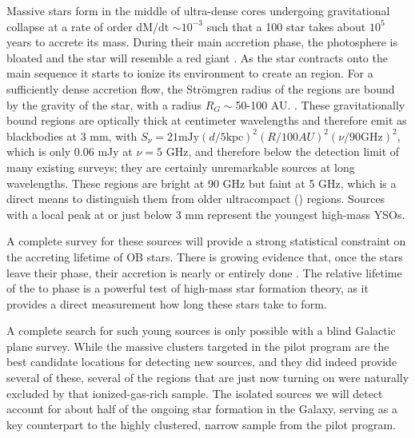 \documentclass[11pt,preprint]{aastex_nofoot}
\begin{document}
Massive stars form in the middle of ultra-dense cores undergoing gravitational
collapse at a rate of order dM/dt $\sim 10^{-3}$ \msun \peryr such that a 100
\msun star takes about $10^5$ years to accrete its mass.  During their main
accretion phase, the photosphere is bloated and the star will resemble a
red giant \citep{Yorke2002a,Hosokawa2009a}.    As the star contracts onto the
main sequence it starts to ionize its environment to create an \hchii region.
For a sufficiently dense accretion flow, the Strömgren
radius of the \hchii regions are bound by the gravity of the star, with a
radius $R_G \sim$50-100 AU. \citep{Keto2002a,Keto2003a,Keto2007a}.  These
gravitationally bound \hchii regions are optically thick at centimeter
wavelengths and therefore emit as blackbodies at 3 mm, with $S_\nu=21 \textrm{mJy} (d/5
\textrm{kpc})^2 (R/100 AU)^2(\nu/90 \textrm{GHz})^2$, which is only 0.06 mJy at
$\nu=5$ GHz, and therefore below the detection limit of many existing surveys;
they are certainly unremarkable sources at long wavelengths.
These \hchii regions are bright at 90 GHz but faint at 5 GHz, which is a
direct means to distinguish them from older ultracompact (\uchii) regions.
Sources with a local peak at or just below 3 mm represent the youngest
high-mass YSOs.

A complete survey for these sources will provide a strong statistical
constraint on the accreting lifetime of OB stars.  There is growing evidence
that, once the stars leave their \hchii phase, their accretion is nearly or
entirely done \citep[e.g.,][]{Goddi2018a}.  The relative lifetime of the \hchii
to \uchii phase is a powerful test of high-mass star formation theory, as it
provides a direct measurement how long these stars take to form.

A complete search for such young sources is only possible with a blind Galactic
plane survey.  While the massive clusters targeted in the pilot program are the
best candidate locations for detecting new sources, and they did indeed provide
several of these, several of  the regions that are just now turning on were
naturally excluded by that ionized-gas-rich sample.  The isolated sources we
will detect account for about half of the ongoing star formation in the Galaxy,
serving as a key counterpart to the highly clustered, narrow sample from the
pilot program.
\end{document}
